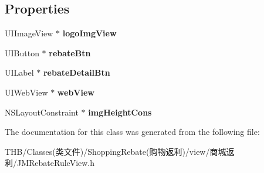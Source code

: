 \subsection*{Properties}
\begin{DoxyCompactItemize}
\item 
\mbox{\label{interface_j_m_rebate_rule_view_a3bc5107a184a8d569a3cf40ba3a4ed66}} 
U\+I\+Image\+View $\ast$ {\bfseries logo\+Img\+View}
\item 
\mbox{\label{interface_j_m_rebate_rule_view_a78b4bd31c07d8731a59f58782e11be30}} 
U\+I\+Button $\ast$ {\bfseries rebate\+Btn}
\item 
\mbox{\label{interface_j_m_rebate_rule_view_a4968bf57197b8618a6d77a3af0da6728}} 
U\+I\+Label $\ast$ {\bfseries rebate\+Detail\+Btn}
\item 
\mbox{\label{interface_j_m_rebate_rule_view_a9e1667941ad3099068bd87e7f43a0326}} 
U\+I\+Web\+View $\ast$ {\bfseries web\+View}
\item 
\mbox{\label{interface_j_m_rebate_rule_view_af52031f76127206fa9ebd9f82a4a8744}} 
N\+S\+Layout\+Constraint $\ast$ {\bfseries img\+Height\+Cons}
\end{DoxyCompactItemize}


The documentation for this class was generated from the following file\+:\begin{DoxyCompactItemize}
\item 
T\+H\+B/\+Classes(类文件)/\+Shopping\+Rebate(购物返利)/view/商城返利/J\+M\+Rebate\+Rule\+View.\+h\end{DoxyCompactItemize}

